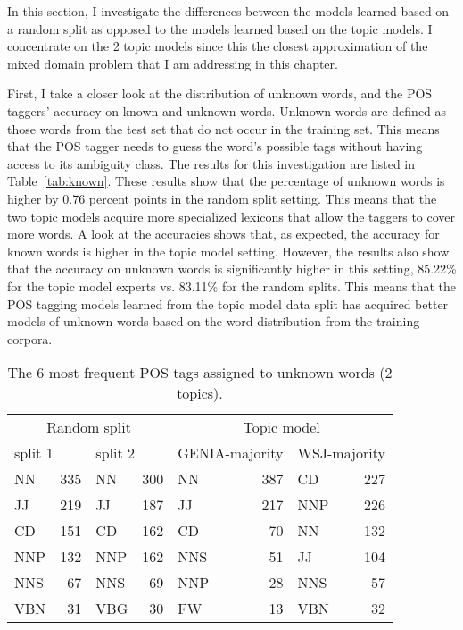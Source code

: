 In this section, I investigate the differences between the models learned based on a random split as opposed to the models learned based on the topic models. I concentrate on the 2 topic models since this the closest approximation of the mixed domain problem that I am addressing in this chapter.

First, I take a closer look at the distribution of unknown words, and the POS taggers' accuracy on known and unknown words.  Unknown words are defined as those words from the test set that do not occur in the training set. This means that the POS tagger needs to guess the word's possible tags without having access to its ambiguity class. The results for this investigation are listed in Table~\ref{tab:known}. These results show that the percentage of unknown words is higher by 0.76 percent points in the random split setting. This means that the two topic models acquire more specialized lexicons that allow the taggers to cover more words. A look at the accuracies shows that, as expected, the accuracy for known words is higher in the topic model setting. However, the results also show that the accuracy on unknown words is significantly higher in this setting, 85.22\%  for the topic model experts vs. 83.11\% for the random splits. This means that the POS tagging models learned from the topic model data split has acquired better models of unknown words based on the word distribution from the training corpora.

\begin{table}[t]
\begin{small}
	\begin{center}
		\begin{tabular}{lrlr|lrlr}
			\multicolumn{4}{c}{Random split} &  \multicolumn{4}{|c}{Topic model}\\
			\multicolumn{2}{l}{split 1} & \multicolumn{2}{l}{split 2} & \multicolumn{2}{|l}{GENIA-majority} & \multicolumn{2}{l}{WSJ-majority} \\
			\hline
			NN	& 335	&	NN	& 300		   & NN	  & 387 	& CD	&  227							\\
			JJ	& 219   &	JJ	& 187		   & JJ	  & 217 	& NNP	&  226							\\
			CD	& 151   &	CD	& 162		   & CD	  & 70		& NN	&  132 							\\
			NNP	& 132   &	NNP	& 162		   & NNS  & 51		& JJ	&  104 							\\
			NNS	& 67    &	NNS	& 69		   & NNP  & 28		& NNS	&  57 							\\
			VBN	& 31    &	VBG	& 30		   & FW	  & 13		& VBN	&  32 							\\
			\hline
		\end{tabular}
	\end{center}
	\end{small}
	\caption{The 6 most frequent POS tags assigned to unknown words (2 topics).\label{tab:res:unkpos}}
\end{table}


